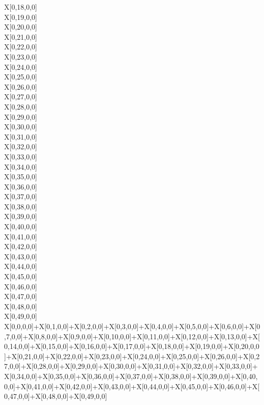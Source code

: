 \documentclass[11pt]{article}
\begin{document}
        X[0,18,0,0] \\
        X[0,19,0,0] \\
        X[0,20,0,0] \\
        X[0,21,0,0] \\
        X[0,22,0,0] \\
        X[0,23,0,0] \\
        X[0,24,0,0] \\
        X[0,25,0,0] \\
        X[0,26,0,0] \\
        X[0,27,0,0] \\
        X[0,28,0,0] \\
        X[0,29,0,0] \\
        X[0,30,0,0] \\
        X[0,31,0,0] \\
        X[0,32,0,0] \\
        X[0,33,0,0] \\
        X[0,34,0,0] \\
        X[0,35,0,0] \\
        X[0,36,0,0] \\
        X[0,37,0,0] \\
        X[0,38,0,0] \\
        X[0,39,0,0] \\
        X[0,40,0,0] \\
        X[0,41,0,0] \\
        X[0,42,0,0] \\
        X[0,43,0,0] \\
        X[0,44,0,0] \\
        X[0,45,0,0] \\
        X[0,46,0,0] \\
        X[0,47,0,0] \\
        X[0,48,0,0] \\
        X[0,49,0,0] \\
        X[0,0,0,0]+X[0,1,0,0]+X[0,2,0,0]+X[0,3,0,0]+X[0,4,0,0]+X[0,5,0,0]+X[0,6,0,0]+X[0,7,0,0]+X[0,8,0,0]+X[0,9,0,0]+X[0,10,0,0]+X[0,11,0,0]+X[0,12,0,0]+X[0,13,0,0]+X[0,14,0,0]+X[0,15,0,0]+X[0,16,0,0]+X[0,17,0,0]+X[0,18,0,0]+X[0,19,0,0]+X[0,20,0,0]+X[0,21,0,0]+X[0,22,0,0]+X[0,23,0,0]+X[0,24,0,0]+X[0,25,0,0]+X[0,26,0,0]+X[0,27,0,0]+X[0,28,0,0]+X[0,29,0,0]+X[0,30,0,0]+X[0,31,0,0]+X[0,32,0,0]+X[0,33,0,0]+X[0,34,0,0]+X[0,35,0,0]+X[0,36,0,0]+X[0,37,0,0]+X[0,38,0,0]+X[0,39,0,0]+X[0,40,0,0]+X[0,41,0,0]+X[0,42,0,0]+X[0,43,0,0]+X[0,44,0,0]+X[0,45,0,0]+X[0,46,0,0]+X[0,47,0,0]+X[0,48,0,0]+X[0,49,0,0] \\
\end{document}
